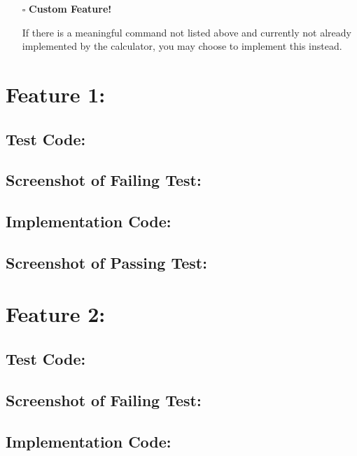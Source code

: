 \documentclass{article}
\begin{document}
\begin{itemize}
  \item[$\square$] \textbf{Custom Feature!}
  
If there is a meaningful command not listed above and currently not already implemented by the calculator, you may choose to implement this instead.\newline
\end{itemize}

\newpage
\section*{Feature 1:}
\subsection*{Test Code:}
\vspace*{5cm}
\subsection*{Screenshot of Failing Test:}
\vspace*{5cm}
\subsection*{Implementation Code:}
\vspace*{5cm}
\subsection*{Screenshot of Passing Test:}
\vspace*{5cm}

\newpage
\section*{Feature 2:}
\subsection*{Test Code:}
\vspace*{5cm}
\subsection*{Screenshot of Failing Test:}
\vspace*{5cm}
\subsection*{Implementation Code:}
\vspace*{5cm}
\end{document}
